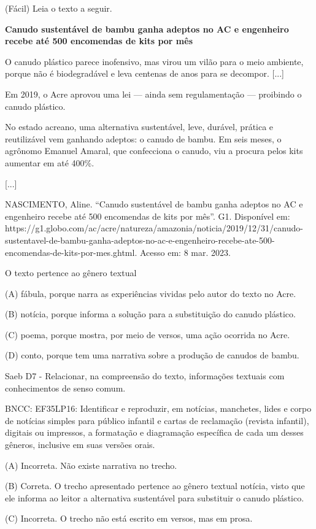 \begin{itemize}
{{{\begin{itemize}
\begin{itemize}
\begin{itemize}
(Fácil) Leia o texto a seguir.

\textbf{Canudo sustentável de bambu ganha adeptos no AC e engenheiro
recebe até 500 encomendas de kits por mês}

O canudo plástico parece inofensivo, mas virou um vilão para o meio
ambiente, porque não é biodegradável e leva centenas de anos para se
decompor. {[}...{]}

Em 2019, o Acre aprovou uma lei --- ainda sem regulamentação ---
proibindo o canudo plástico.

No estado acreano, uma alternativa sustentável, leve, durável, prática e
reutilizável vem ganhando adeptos: o canudo de bambu. Em seis meses, o
agrônomo Emanuel Amaral, que confecciona o canudo, viu a procura pelos
kits aumentar em até 400\%.

{[}...{]}

NASCIMENTO, Aline. ``Canudo sustentável de bambu ganha adeptos no AC e
engenheiro recebe até 500 encomendas de kits por mês''. G1. Disponível
em:
https://g1.globo.com/ac/acre/natureza/amazonia/noticia/2019/12/31/canudo-sustentavel-de-bambu-ganha-adeptos-no-ac-e-engenheiro-recebe-ate-500-encomendas-de-kits-por-mes.ghtml.
Acesso em: 8 mar. 2023.

O texto pertence ao gênero textual

(A) fábula, porque narra as experiências vividas pelo autor do texto no
Acre.

(B) notícia, porque informa a solução para a substituição do canudo
plástico.

(C) poema, porque mostra, por meio de versos, uma ação ocorrida no Acre.

(D) conto, porque tem uma narrativa sobre a produção de canudos de
bambu.

Saeb D7 - Relacionar, na compreensão do texto, informações textuais com
conhecimentos de senso comum.

BNCC: EF35LP16: Identificar e reproduzir, em notícias, manchetes, lides
e corpo de notícias simples para público infantil e cartas de reclamação
(revista infantil), digitais ou impressos, a formatação e diagramação
específica de cada um desses gêneros, inclusive em suas versões orais.

(A) Incorreta. Não existe narrativa no trecho.

(B) Correta. O trecho apresentado pertence ao gênero textual notícia,
visto que ele informa ao leitor a alternativa sustentável para
substituir o canudo plástico.

(C) Incorreta. O trecho não está escrito em versos, mas em prosa.


\end{itemize}
\end{itemize}
\end{itemize}}}}
\end{itemize}

